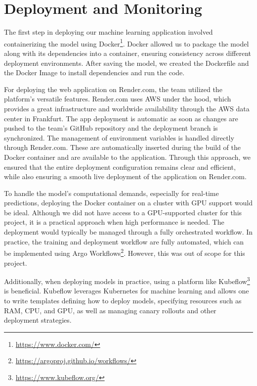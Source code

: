 \section{Deployment and Monitoring}
The first step in deploying our machine learning application involved containerizing
the model using Docker\footnote{\url{https://www.docker.com/}}. Docker
allowed us to package the model along with its dependencies into a
container, ensuring consistency across different deployment environments.
After saving the model, we created the Dockerfile and the Docker Image to
install dependencies and run the code.

For deploying the web application on Render.com, the team
utilized the platform's versatile features. Render.com uses
\ac{AWS} under the hood, which provides
a great infrastructure and worldwide availability through
the \ac{AWS} data center in Frankfurt. The app deployment is automatic as
soon as changes are pushed to the team's GitHub repository and the
deployment branch is synchronized.
The management of environment variables is handled directly through Render.com.
These are automatically inserted during the build of the Docker container and
are available to the application. Through this approach, we ensured that
the entire deployment configuration remains clear and efficient, while also
ensuring a smooth live deployment of the application on Render.com.

To handle the model's computational demands, especially for real-time
predictions, deploying the Docker container on a cluster with GPU support
would be ideal. Although we did not have access to a GPU-supported cluster
for this project, it is a practical approach when high performance is needed.
The deployment would typically be managed through a fully orchestrated workflow.
In practice, the training and deployment workflow are fully automated,
which can be implemented using Argo Workflows\footnote{\url{https://argoproj.github.io/workflows/}}.
However, this was out of scope for this project.

Additionally, when deploying models in practice, using a platform like
Kubeflow\footnote{\url{https://www.kubeflow.org/}} is beneficial. Kubeflow
leverages Kubernetes for machine learning and allows one to write templates
defining how to deploy models, specifying resources such as RAM, CPU, and GPU,
as well as managing canary rollouts and other deployment strategies.

